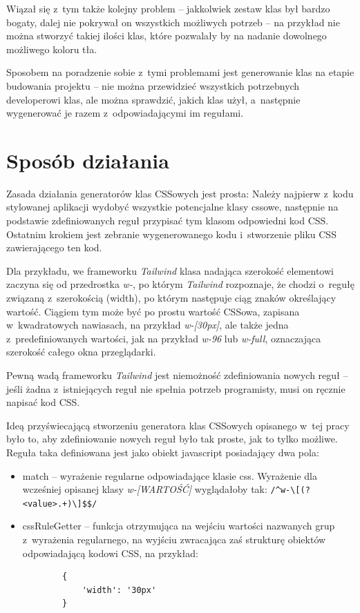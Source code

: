 \documentclass{SGGW-thesis}
\begin{document}
Wiązał się z~tym także kolejny problem -- jakkolwiek zestaw klas był bardzo bogaty, dalej nie pokrywał on wszystkich możliwych potrzeb -- na przykład nie można stworzyć takiej ilości klas, które pozwalały by na nadanie dowolnego możliwego koloru tła.

Sposobem na poradzenie sobie z~tymi problemami jest generowanie klas na etapie budowania projektu -- nie można przewidzieć wszystkich potrzebnych developerowi klas, ale można sprawdzić, jakich klas użył, a~następnie wygenerować je razem z~odpowiadającymi im regułami.


\section{Sposób działania}
Zasada działania generatorów klas CSSowych jest prosta: Należy najpierw z~kodu stylowanej aplikacji wydobyć wszystkie potencjalne klasy cssowe, następnie na podstawie zdefiniowanych reguł przypisać tym klasom odpowiedni kod CSS. Ostatnim krokiem jest zebranie wygenerowanego kodu i~stworzenie pliku CSS zawierającego ten kod.

Dla przykładu, we frameworku \emph{Tailwind} klasa nadająca szerokość elementowi zaczyna się od przedrostka \emph{w-}, po którym \emph{Tailwind} rozpoznaje, że chodzi o~regułę związaną z~szerokością (width), po którym następuje ciąg znaków określający wartość. Ciągiem tym może być po prostu wartość CSSowa, zapisana w~kwadratowych nawiasach, na przykład \emph{w-[30px]}, ale także jedna z~predefiniowanych wartości, jak na przykład \emph{w-96} lub \emph{w-full}, oznaczająca szerokość całego okna przeglądarki\cite{Tailwind_jit}.

Pewną wadą frameworku \emph{Tailwind} jest niemożność zdefiniowania nowych reguł -- jeśli żadna z~istniejących reguł nie spełnia potrzeb programisty, musi on ręcznie napisać kod CSS.

Ideą przyświecającą stworzeniu generatora klas CSSowych opisanego w~tej pracy było to, aby zdefiniowanie nowych reguł było tak proste, jak to tylko możliwe. Reguła taka definiowana jest jako obiekt javascript posiadający dwa pola:
\begin{itemize}
    \item match -- wyrażenie regularne odpowiadające klasie css. Wyrażenie dla wcześniej opisanej klasy \emph{w-[WARTOŚĆ]} wyglądałoby tak: \verb|/^w-\[(?<value>.+)\]$$/|
    \item cssRuleGetter -- funkcja otrzymująca na wejściu wartości nazwanych grup z~wyrażenia regularnego, na wyjściu zwracająca zaś strukturę obiektów odpowiadającą kodowi CSS, na przykład:
    \begin{verbatim}
        {
            'width': '30px'
        }
    \end{verbatim}
\end{itemize}
\end{document}
